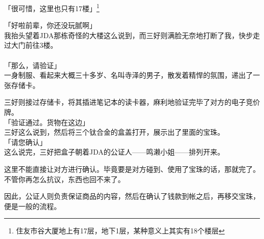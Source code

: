 「很可惜，这里也只有17楼」\footnote{住友市谷大厦地上有17层，地下1层，某种意义上其实有18个楼层}

「好啦前辈，你还没玩腻啊」\\

我抬头望着JDA那栋奇怪的大楼这么说到，而三好则满脸无奈地打断了我，快步走过大门前往3楼。\\

\sqsplit\\

「那么，请验证」\\

一身制服、看起来大概三十多岁、名叫寺泽的男子，散发着精悍的氛围，递出了一张存储卡。

三好则接过存储卡，将其插进笔记本的读卡器，麻利地验证完毕了对方的电子竞价牌。\\

「验证通过。货物在这边」\\

三好这么说到，然后将三个钛合金的盒盖打开，展示出了里面的宝珠。\\

「请您确认」\\

这么说完，三好把盒子朝着JDA的公证人——鸣濑小姐——排列开来。

这里不能直接让对方进行确认。毕竟要是对方碰到、使用了宝珠的话，那就完了。不管你再怎么抗议，东西也回不来了。

因此，公证人则负责保证商品的内容，然后在确认了钱款到帐之后，再移交宝珠，便是一般的流程。\\

